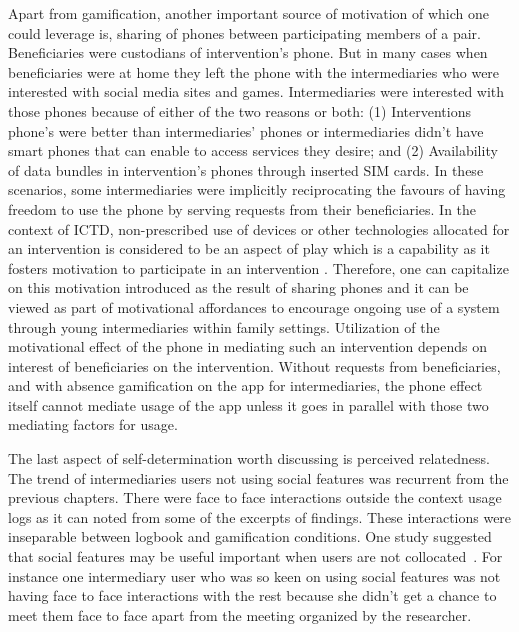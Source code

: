 Apart from gamification, another important source of motivation of which one could leverage is, sharing of phones between participating members of a pair. Beneficiaries were custodians of intervention's phone. But in many cases when beneficiaries were at home they left the phone with the intermediaries who were interested with social media sites and  games. Intermediaries were interested with those phones because of either of the two reasons or both: (1) Interventions phone's were better than intermediaries' phones or intermediaries didn't have smart phones that can enable to access services they desire; and (2) Availability of data bundles in intervention's phones through inserted SIM cards. In these scenarios, some intermediaries were implicitly reciprocating the favours of having freedom to use the phone by serving requests from their beneficiaries. In the context of ICTD, non-prescribed use of devices or other technologies allocated for an intervention is considered to be an aspect of play which is a capability as it fosters motivation to participate in an intervention \citep{ferrplay2015}. Therefore, one can capitalize on this motivation introduced as the result of sharing phones and it can be viewed as part of motivational affordances to encourage ongoing use of a system through young intermediaries within family settings. Utilization of the motivational effect of the phone in mediating such an intervention depends on interest of beneficiaries on the intervention. Without requests from beneficiaries, and with absence gamification on the app for intermediaries, the phone effect itself cannot mediate usage of the app unless it goes in parallel with those two mediating factors for usage.

The last aspect of self-determination worth discussing is perceived relatedness. The trend of intermediaries users not using social features was recurrent from the previous chapters. There were face to face interactions outside the context usage logs as it can noted from some of the excerpts of findings. These interactions were inseparable between logbook and gamification conditions. One study suggested that social features may be useful important when users are not collocated~\cite{lin2006:fish}. For instance one intermediary user who was so keen on using social features was not having face to face interactions with the rest because she didn't get a chance to meet them face to face apart from the meeting organized by the researcher. 
